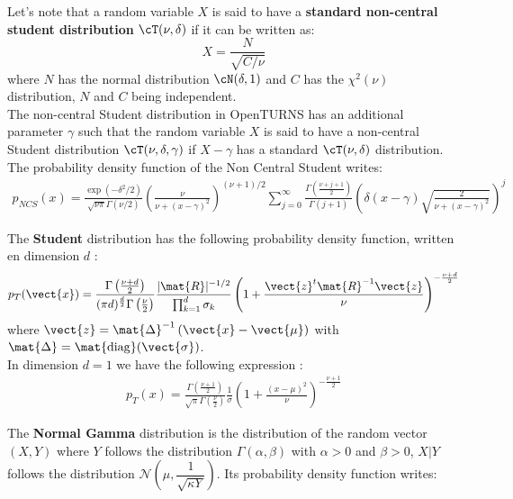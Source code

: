 \vspace*{0.2cm}
Let's note that a random variable $X$ is said to have a  {\bf standard non-central student distribution} $\cT(\nu, \delta)$ if it can be written as:
\begin{equation}
  X = \frac{N}{\sqrt{C/\nu}}
\end{equation}
where $N$ has the normal distribution $\cN(\delta, 1)$ and $C$ has the $\chi^2(\nu)$ distribution, $N$ and $C$ being independent.\\
The non-central Student distribution in OpenTURNS has an additional parameter $\gamma$ such that the random variable $X$ is said to have a non-central Student distribution $\cT(\nu, \delta, \gamma)$ if $X-\gamma$ has a standard $\cT(\nu,\delta)$ distribution.\\

The probability density function of the Non Central Student writes:
\begin{align*}
  p_{NCS}(x) = \frac{\exp(-\delta^2 / 2)}{\sqrt{\nu\pi} \Gamma(\nu / 2)}\left(\frac{\nu}{\nu + (x-\gamma)^2}\right) ^ {(\nu + 1) / 2} \sum_{j=0}^{\infty} \frac{\Gamma\left(\frac{\nu + j + 1}{2}\right)}{\Gamma(j + 1)}\left(\delta(x-\gamma)\sqrt{\frac{2}{\nu + (x-\gamma)^2}}\right) ^ j
\end{align*}

The  {\bf Student} distribution has the following  probability density function, written en dimension $d$ :
\begin{align*}
  p_T(\vect{x}) = \frac{\Gamma\left(\frac{\nu+d}{2}\right)}
  {(\pi d)^{\frac{d}{2}}\Gamma\left(\frac{\nu}{2}\right)}\frac{|\mat{R}|^{-1/2}}{\prod_{k=1}^d\sigma_k}\left(1+\frac{\vect{z}^t\mat{R}^{-1}\vect{z}}{\nu}\right)^{-\frac{\nu+d}{2}}
\end{align*}
where $\vect{z}=\mat{\Delta}^{-1}\left(\vect{x}-\vect{\mu}\right)$ with $\mat{\Delta}=\mat{\mathrm{diag}}(\vect{\sigma})$.\\

In dimension $d=1$ we have the following expression :
\begin{align*}
  \displaystyle p_T(x) = \frac{\Gamma\left(\frac{\nu+1}{2}\right)}
  {\sqrt{\pi}\Gamma\left(\frac{\nu}{2}\right)}\frac{1}{\sigma}\left(1+\frac{(x-\mu)^2}{\nu}\right)^{-\frac{\nu+1}{2}}
\end{align*}

The {\bf Normal Gamma} distribution is the distribution of the random vector $(X,Y)$ where $Y$ follows the distribution $\Gamma(\alpha, \beta)$ with $\alpha>0$ and $\beta>0$, $X|Y$ follows the distribution $\mathcal{N}(\mu, \dfrac{1}{\sqrt{\kappa Y}})$. Its probability density function writes:

